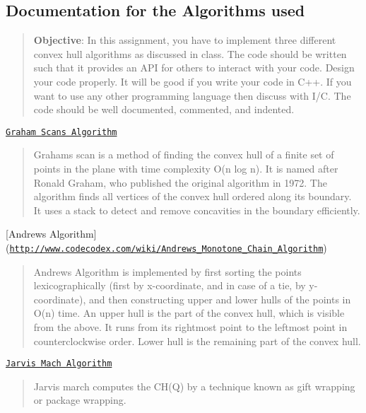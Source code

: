 \subsection*{Documentation for the Algorithms used }

\begin{quote}
{\bfseries Objective}\+: In this assignment, you have to implement three different convex hull algorithms as discussed in class. The code should be written such that it provides an A\+PI for others to interact with your code. Design your code properly. It will be good if you write your code in C++. If you want to use any other programming language then discuss with I/C. The code should be well documented, commented, and indented. \end{quote}



\begin{DoxyEnumerate}
\item \href{https://en.wikipedia.org/wiki/Graham_scan}{\tt Graham Scans Algorithm} \begin{quote}
Graham\textquotesingle{}s scan is a method of finding the convex hull of a finite set of points in the plane with time complexity O(n log n). It is named after Ronald Graham, who published the original algorithm in 1972. The algorithm finds all vertices of the convex hull ordered along its boundary. It uses a stack to detect and remove concavities in the boundary efficiently. \end{quote}

\item \mbox{[}Andrews Algorithm\mbox{]}(\href{http://www.codecodex.com/wiki/Andrew's_Monotone_Chain_Algorithm}{\tt http\+://www.\+codecodex.\+com/wiki/\+Andrew\textquotesingle{}s\+\_\+\+Monotone\+\_\+\+Chain\+\_\+\+Algorithm}) \begin{quote}
Andrew\textquotesingle{}s Algorithm is implemented by first sorting the points lexicographically (first by x-\/coordinate, and in case of a tie, by y-\/coordinate), and then constructing upper and lower hulls of the points in O(n) time. An upper hull is the part of the convex hull, which is visible from the above. It runs from its rightmost point to the leftmost point in counterclockwise order. Lower hull is the remaining part of the convex hull. \end{quote}

\item \href{http://www.personal.kent.edu/~rmuhamma/Compgeometry/MyCG/ConvexHull/jarvisMarch.htm}{\tt Jarvis Mach Algorithm} \begin{quote}
Jarvis march computes the C\+H(\+Q) by a technique known as gift wrapping or package wrapping.\end{quote}

\end{DoxyEnumerate}